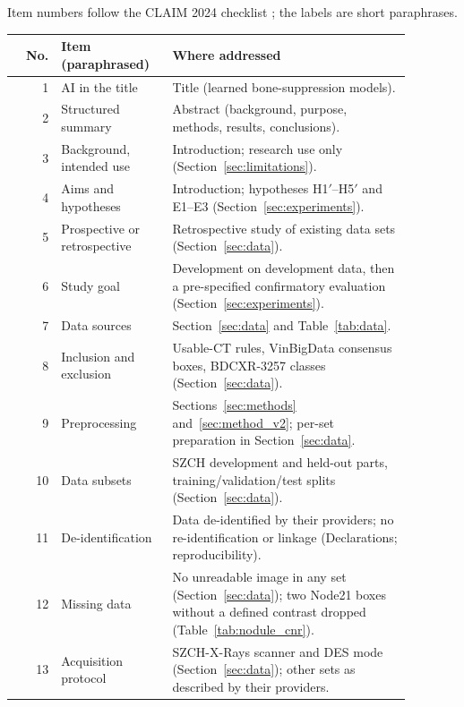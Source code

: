 Item numbers follow the CLAIM 2024 checklist \citep{tejani2024claim}; the labels are short paraphrases.
{\footnotesize
\begin{longtable}{@{}rp{0.28\linewidth}p{0.6\linewidth}@{}}
\toprule
No. & Item (paraphrased) & Where addressed \\
\midrule
\endhead
1 & AI in the title & Title (learned bone-suppression models). \\
2 & Structured summary & Abstract (background, purpose, methods, results, conclusions). \\
3 & Background, intended use & Introduction; research use only (Section~\ref{sec:limitations}). \\
4 & Aims and hypotheses & Introduction; hypotheses H1$'$--H5$'$ and E1--E3 (Section~\ref{sec:experiments}). \\
5 & Prospective or retrospective & Retrospective study of existing data sets (Section~\ref{sec:data}). \\
6 & Study goal & Development on development data, then a pre-specified confirmatory evaluation (Section~\ref{sec:experiments}). \\
7 & Data sources & Section~\ref{sec:data} and Table~\ref{tab:data}. \\
8 & Inclusion and exclusion & Usable-CT rules, VinBigData consensus boxes, BDCXR-3257 classes (Section~\ref{sec:data}). \\
9 & Preprocessing & Sections~\ref{sec:methods} and~\ref{sec:method_v2}; per-set preparation in Section~\ref{sec:data}. \\
10 & Data subsets & SZCH development and held-out parts, training/validation/test splits (Section~\ref{sec:data}). \\
11 & De-identification & Data de-identified by their providers; no re-identification or linkage (Declarations; reproducibility). \\
12 & Missing data & No unreadable image in any set (Section~\ref{sec:data}); two Node21 boxes without a defined contrast dropped (Table~\ref{tab:nodule_cnr}). \\
13 & Acquisition protocol & SZCH-X-Rays scanner and DES mode (Section~\ref{sec:data}); other sets as described by their providers. \\

\end{longtable}}
